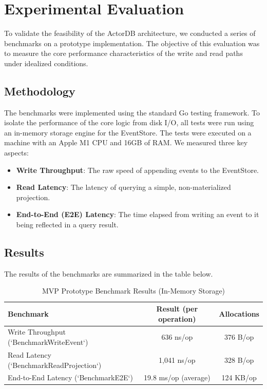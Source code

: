 \documentclass{article}
\begin{document}
\section{Experimental Evaluation}
To validate the feasibility of the ActorDB architecture, we conducted a series of benchmarks on a prototype implementation. The objective of this evaluation was to measure the core performance characteristics of the write and read paths under idealized conditions.

\subsection{Methodology}
The benchmarks were implemented using the standard Go testing framework. To isolate the performance of the core logic from disk I/O, all tests were run using an in-memory storage engine for the EventStore. The tests were executed on a machine with an Apple M1 CPU and 16GB of RAM. We measured three key aspects:
\begin{itemize}
    \item \textbf{Write Throughput}: The raw speed of appending events to the EventStore.
    \item \textbf{Read Latency}: The latency of querying a simple, non-materialized projection.
    \item \textbf{End-to-End (E2E) Latency}: The time elapsed from writing an event to it being reflected in a query result.
\end{itemize}

\subsection{Results}
The results of the benchmarks are summarized in the table below.

\begin{table}[h!]
\centering
\begin{tabular}{|l|c|c|}
\hline
\textbf{Benchmark} & \textbf{Result (per operation)} & \textbf{Allocations} \\
\hline
Write Throughput (`BenchmarkWriteEvent`) & 636 ns/op & 376 B/op \\
Read Latency (`BenchmarkReadProjection`) & 1,041 ns/op & 328 B/op \\
End-to-End Latency (`BenchmarkE2E`) & 19.8 ms/op (average) & 124 KB/op \\
\hline
\end{tabular}
\caption{MVP Prototype Benchmark Results (In-Memory Storage)}
\label{tab:results}
\end{table}
\end{document}
